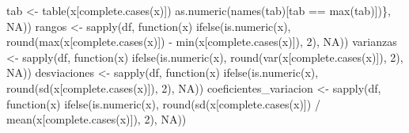 \documentclass[
  10pt,
  letterpaper,
  DIV=11,
  numbers=noendperiod]{scrreprt}
\newenvironment{Shaded}{\begin{snugshade}}{\end{snugshade}}
\newcommand{\ConstantTok}[1]{\textcolor[rgb]{0.56,0.35,0.01}{#1}}
\newcommand{\ControlFlowTok}[1]{\textcolor[rgb]{0.00,0.23,0.31}{#1}}
\newcommand{\DecValTok}[1]{\textcolor[rgb]{0.68,0.00,0.00}{#1}}
\newcommand{\FunctionTok}[1]{\textcolor[rgb]{0.28,0.35,0.67}{#1}}
\newcommand{\NormalTok}[1]{\textcolor[rgb]{0.00,0.23,0.31}{#1}}
\newcommand{\OtherTok}[1]{\textcolor[rgb]{0.00,0.23,0.31}{#1}}
\newcommand{\SpecialCharTok}[1]{\textcolor[rgb]{0.37,0.37,0.37}{#1}}
\begin{document}
\begin{Shaded}
\begin{Highlighting}[numbers=left,,]
\NormalTok{        tab }\OtherTok{\textless{}{-}} \FunctionTok{table}\NormalTok{(x[}\FunctionTok{complete.cases}\NormalTok{(x)])}
        \FunctionTok{as.numeric}\NormalTok{(}\FunctionTok{names}\NormalTok{(tab)[tab }\SpecialCharTok{==} \FunctionTok{max}\NormalTok{(tab)])\}, }\ConstantTok{NA}\NormalTok{))}
\NormalTok{    rangos }\OtherTok{\textless{}{-}} \FunctionTok{sapply}\NormalTok{(df, }\ControlFlowTok{function}\NormalTok{(x) }\FunctionTok{ifelse}\NormalTok{(}\FunctionTok{is.numeric}\NormalTok{(x), }\FunctionTok{round}\NormalTok{(}\FunctionTok{max}\NormalTok{(x[}\FunctionTok{complete.cases}\NormalTok{(x)]) }\SpecialCharTok{{-}} \FunctionTok{min}\NormalTok{(x[}\FunctionTok{complete.cases}\NormalTok{(x)]), }\DecValTok{2}\NormalTok{), }\ConstantTok{NA}\NormalTok{))}
\NormalTok{    varianzas }\OtherTok{\textless{}{-}} \FunctionTok{sapply}\NormalTok{(df, }\ControlFlowTok{function}\NormalTok{(x) }\FunctionTok{ifelse}\NormalTok{(}\FunctionTok{is.numeric}\NormalTok{(x), }\FunctionTok{round}\NormalTok{(}\FunctionTok{var}\NormalTok{(x[}\FunctionTok{complete.cases}\NormalTok{(x)]), }\DecValTok{2}\NormalTok{), }\ConstantTok{NA}\NormalTok{))}
\NormalTok{    desviaciones }\OtherTok{\textless{}{-}} \FunctionTok{sapply}\NormalTok{(df, }\ControlFlowTok{function}\NormalTok{(x) }\FunctionTok{ifelse}\NormalTok{(}\FunctionTok{is.numeric}\NormalTok{(x), }\FunctionTok{round}\NormalTok{(}\FunctionTok{sd}\NormalTok{(x[}\FunctionTok{complete.cases}\NormalTok{(x)]), }\DecValTok{2}\NormalTok{), }\ConstantTok{NA}\NormalTok{))}
\NormalTok{    coeficientes\_variacion }\OtherTok{\textless{}{-}} \FunctionTok{sapply}\NormalTok{(df, }\ControlFlowTok{function}\NormalTok{(x) }\FunctionTok{ifelse}\NormalTok{(}\FunctionTok{is.numeric}\NormalTok{(x), }\FunctionTok{round}\NormalTok{(}\FunctionTok{sd}\NormalTok{(x[}\FunctionTok{complete.cases}\NormalTok{(x)]) }\SpecialCharTok{/} \FunctionTok{mean}\NormalTok{(x[}\FunctionTok{complete.cases}\NormalTok{(x)]), }\DecValTok{2}\NormalTok{), }\ConstantTok{NA}\NormalTok{))}
    

\end{Highlighting}
\end{Shaded}
\end{document}
